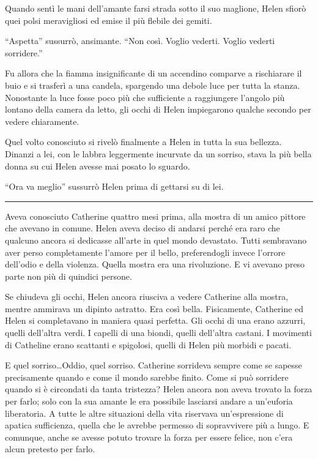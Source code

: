 Quando sentì le mani dell'amante farsi strada sotto il suo maglione, Helen sfiorò quei polsi
meravigliosi ed emise il più flebile dei gemiti.

``Aspetta'' sussurrò, ansimante. ``Non così. Voglio vederti. Voglio vederti sorridere.''

Fu allora che la fiamma insignificante di un accendino comparve a rischiarare il buio e si trasferì
a una candela, spargendo una debole luce per tutta la stanza. Nonostante la luce fosse poco più che
sufficiente a raggiungere l'angolo più lontano della camera da letto, gli occhi di Helen impiegarono
qualche secondo per vedere chiaramente.

Quel volto conosciuto si rivelò finalmente a Helen in tutta la sua bellezza. Dinanzi a lei, con le
labbra leggermente incurvate da un sorriso, stava la più bella donna su cui Helen avesse mai posato
lo sguardo.

``Ora va meglio'' sussurrò Helen prima di gettarsi su di lei.

\plainbreak{1}

Aveva conosciuto Catherine quattro mesi prima, alla mostra di un amico pittore che avevano in
comune. Helen aveva deciso di andarsi perché era raro che qualcuno ancora si dedicasse all'arte in
quel mondo devastato. Tutti sembravano aver perso completamente l'amore per il bello, preferendogli
invece l'orrore dell'odio e della violenza. Quella mostra era una rivoluzione. E vi avevano preso
parte non più di quindici persone.

Se chiudeva gli occhi, Helen ancora riusciva a vedere Catherine alla mostra, mentre ammirava un
dipinto astratto. Era così bella. Fisicamente, Catherine ed Helen si completavano in maniera quasi
perfetta. Gli occhi di una erano azzurri, quelli dell'altra verdi. I capelli di una biondi, quelli
dell'altra castani. I movimenti di Catheline erano scattanti e spigolosi, quelli di Helen più
morbidi e pacati.

E quel sorriso\dots Oddio, quel sorriso. Catherine sorrideva sempre come se sapesse precisamente
quando e come il mondo sarebbe finito. Come si può sorridere quando si è circondati da tanta
tristezza? Helen ancora non aveva trovato la forza per farlo; solo con la sua amante le era
possibile lasciarsi andare a un'euforia liberatoria. A tutte le altre situazioni della vita
riservava un'espressione di apatica sufficienza, quella che le avrebbe permesso di sopravvivere più
a lungo. E comunque, anche se avesse potuto trovare la forza per essere felice, non c'era alcun
pretesto per farlo.

